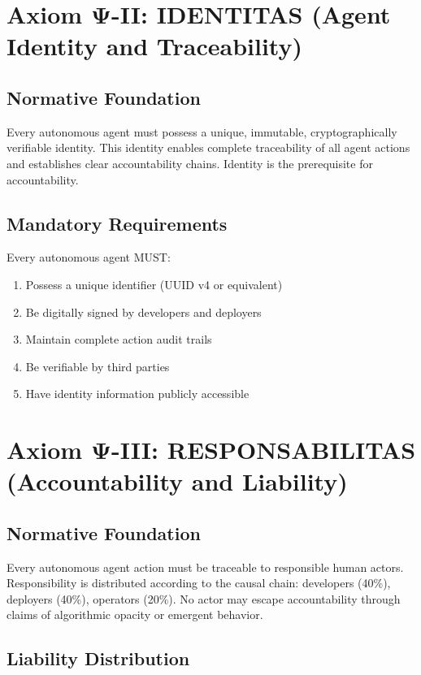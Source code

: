 \documentclass[12pt,a4paper,twoside,openright]{book}
\begin{document}
\section{Axiom Ψ-II: IDENTITAS (Agent Identity and Traceability)}

\subsection{Normative Foundation}

Every autonomous agent must possess a unique, immutable, cryptographically verifiable identity. This identity enables complete traceability of all agent actions and establishes clear accountability chains. Identity is the prerequisite for accountability.

\subsection{Mandatory Requirements}

Every autonomous agent MUST:

\begin{enumerate}
    \item Possess a unique identifier (UUID v4 or equivalent)
    \item Be digitally signed by developers and deployers
    \item Maintain complete action audit trails
    \item Be verifiable by third parties
    \item Have identity information publicly accessible
\end{enumerate}

\section{Axiom Ψ-III: RESPONSABILITAS (Accountability and Liability)}

\subsection{Normative Foundation}

Every autonomous agent action must be traceable to responsible human actors. Responsibility is distributed according to the causal chain: developers (40\%), deployers (40\%), operators (20\%). No actor may escape accountability through claims of algorithmic opacity or emergent behavior.

\subsection{Liability Distribution}
\end{document}
